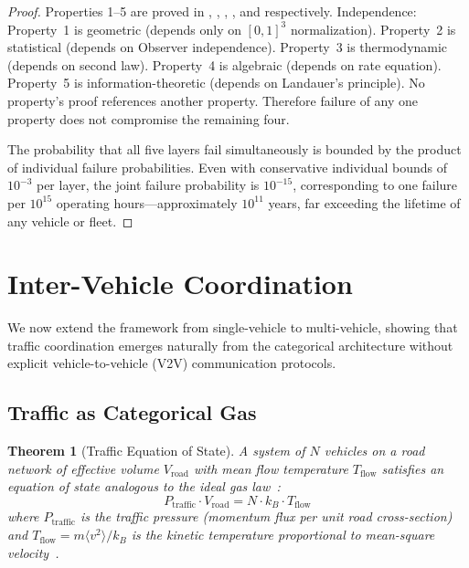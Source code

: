 \documentclass[twocolumn,10pt]{article}
\newtheorem{theorem}{Theorem}[section]
\theoremstyle{definition}
\begin{document}
\begin{proof}
Properties 1--5 are proved in , , , , and  respectively. Independence: Property~1 is geometric (depends only on $[0,1]^3$ normalization). Property~2 is statistical (depends on Observer independence). Property~3 is thermodynamic (depends on second law). Property~4 is algebraic (depends on rate equation). Property~5 is information-theoretic (depends on Landauer's principle). No property's proof references another property. Therefore failure of any one property does not compromise the remaining four.

The probability that all five layers fail simultaneously is bounded by the product of individual failure probabilities. Even with conservative individual bounds of $10^{-3}$ per layer, the joint failure probability is $10^{-15}$, corresponding to one failure per $10^{15}$ operating hours---approximately $10^{11}$ years, far exceeding the lifetime of any vehicle or fleet.
\end{proof}


\section{Inter-Vehicle Coordination}
\label{sec:coordination}

We now extend the framework from single-vehicle to multi-vehicle, showing that traffic coordination emerges naturally from the categorical architecture without explicit vehicle-to-vehicle (V2V) communication protocols.

\subsection{Traffic as Categorical Gas}

\begin{theorem}[Traffic Equation of State]
\label{thm:traffic-eos}
A system of $N$ vehicles on a road network of effective volume $V_{\mathrm{road}}$ with mean flow temperature $T_{\mathrm{flow}}$ satisfies an equation of state analogous to the ideal gas law~\cite{boltzmann1896}:
\begin{equation}
P_{\mathrm{traffic}} \cdot V_{\mathrm{road}} = N \cdot k_B \cdot T_{\mathrm{flow}}
\label{eq:traffic-eos}
\end{equation}
where $P_{\mathrm{traffic}}$ is the traffic pressure (momentum flux per unit road cross-section) and $T_{\mathrm{flow}} = m \langle v^2 \rangle / k_B$ is the kinetic temperature proportional to mean-square velocity~\cite{helbing2001,lighthill1955}.
\end{theorem}
\end{document}
